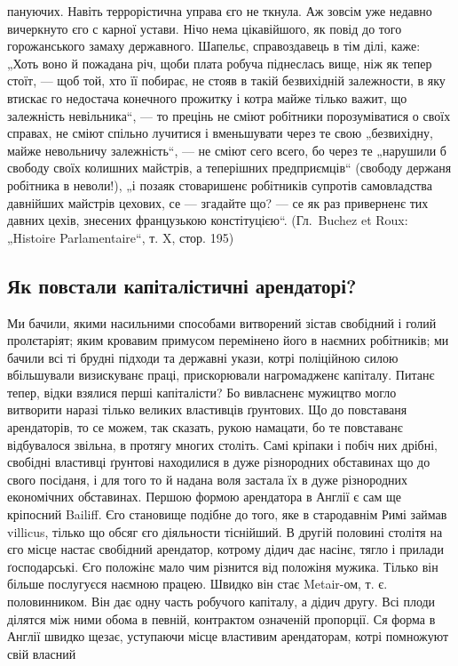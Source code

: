 \parcont{}
пануючих. Навіть террорістична управа єго не ткнула. Аж
зовсім уже недавно вичеркнуто єго с карної устави. Нічо
нема цікавійшого, як повід до того горожанського замаху
державного. Шапельє, справоздавець в тім ділі, каже: „Хоть
воно й пожадана річ, щоби плата робуча піднеслась вище,
ніж як тепер стоїт, — щоб той, хто її побирає, не стояв
в такій безвихідній залежности, в яку втискає го недостача
конечного прожитку і котра майже тілько важит, що залежність
невільника“, — то прецінь не сміют робітники
порозуміватися о своїх справах, не сміют спільно лучитися
і вменьшувати через те свою „безвихідну, майже невольничу
залежність“, — не сміют сего всего, бо через те „нарушили б
свободу своїх колишних майстрів, а теперішних
предприємців“ (свободу держаня робітника в неволи!), „і позаяк
стоваришенє робітників супротів самовладства давнійших
майстрів цехових, се — згадайте що? — се як раз приверненє
тих давних цехів, знесених французькою констітуцією“.
(Гл.~Buchez et Roux: „Histoire Parlamentaire“, т. X,
стор. 195)

\vspace{-\smallskipamount}
\subsection{Як повстали капіталістичні арендаторі?}
\vspace{-\smallskipamount}

Ми бачили, якими насильними способами витворений
зістав свобідний і голий пролєтаріят; яким кровавим примусом
перемінено його в наємних робітників; ми бачили всі
ті брудні підходи та державні укази, котрі поліційною силою
вбільшували визискуванє праці, прискорювали нагромадженє
капіталу. Питанє тепер, відки взялися перші капіталісти?
Бо вивласненє
мужицтво
могло витворити наразі тілько великих властивців ґрунтових.
Що до повставаня арендаторів, то се можем, так сказать, рукою
намацати, бо те повставанє відбувалося звільна, в протягу
многих століть. Самі кріпаки і побіч них дрібні, свобідні
властивці ґрунтові находилися в дуже різнородних обставинах
що до свого посіданя, і для того то й надана воля
застала їх в дуже різнородних економічних обставинах.
Першою формою арендатора в Англії є сам ще кріпосний
Bailiff. Єго становище подібне до того, яке в стародавнім
Римі займав villicus, тілько що обсяг єго діяльности тіснійший.
В другій половині  столітя на єго місце настає свобідний
арендатор, котрому дідич дає насінє, тягло і прилади
ґосподарські. Єго положінє мало чим різнится від
положіня мужика. Тілько він більше послугуєся наємною
працею. Швидко він стає Metair-ом, т. є. половинником. Він
дає одну часть робучого капіталу, а дідич другу. Всі плоди
ділятся між ними обома в певній, контрактом означеній
пропорції. Ся форма в Англії швидко щезає, уступаючи
місце властивим арендаторам, котрі помножуют свій власний
\parbreak{}
